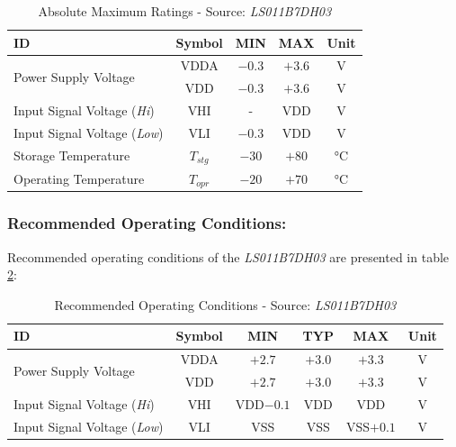 \documentclass[report.tex]{subfiles}
\begin{document}
\begin{table}[H]
\centering
\begin{tabular}{|l|c|c|c|c|}\hline
\textbf{ID} & \textbf{Symbol} & \textbf{MIN} & \textbf{MAX} & \textbf{Unit}\\\hline
\multirow{2}{*}{Power Supply Voltage} & VDDA & $-0.3$ & $+3.6$ & \si{\volt}\\\cline{2-5}
										& VDD & $-0.3$ & $+3.6$ & \si{\volt}\\\hline
Input Signal Voltage (\textit{Hi}) & VHI & - & VDD & \si{\volt}\\\hline
Input Signal Voltage (\textit{Low}) & VLI & $-0.3$ & VDD & \si{\volt}\\\hline
Storage Temperature & $T_{stg}$ & $-30$ & $+80$ & \si{\celsius}\\\hline
Operating Temperature & $T_{opr}$ & $-20$ & $+70$ & \si{\celsius}\\\hline
\end{tabular}
\caption{Absolute Maximum Ratings - Source: \textit{LS011B7DH03}\cite{LS011B7DH03}}
\label{tab:LS011B7DH03_absolute_max_rating}
\end{table}

\subsubsection{Recommended Operating Conditions:}

Recommended operating conditions of the \textit{LS011B7DH03} are presented in table \ref{tab:LS011B7DH03_recom_cond}:

\begin{table}[H]
\centering
\begin{tabular}{|l|c|c|c|c|c|}\hline
\textbf{ID} & \textbf{Symbol} & \textbf{MIN} & {TYP} & \textbf{MAX} & \textbf{Unit}\\\hline
\multirow{2}{*}{Power Supply Voltage} & VDDA & $+2.7$ & $+3.0$ & $+3.3$ & \si{\volt}\\\cline{2-5}
										& VDD & $+2.7$ & $+3.0$ & $+3.3$ & \si{\volt}\\\hline
Input Signal Voltage (\textit{Hi}) & VHI & VDD$-0.1$ & VDD & VDD & \si{\volt}\\\hline
Input Signal Voltage (\textit{Low}) & VLI & VSS & VSS & VSS$+0.1$ & \si{\volt}\\\hline
\end{tabular}
\caption{Recommended Operating Conditions - Source: \textit{LS011B7DH03}\cite{LS011B7DH03}}
\label{tab:LS011B7DH03_recom_cond}
\end{table}
\end{document}
